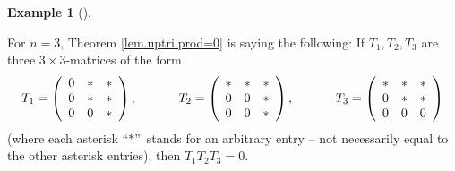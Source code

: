 \documentclass[numbers=enddot,12pt,final,onecolumn,notitlepage]{scrartcl}%
\numberwithin{exer}{subsection}
\theoremstyle{definition}
\newtheorem{exam}[theo]{Example}
\newenvironment{example}[1][]
{\begin{exam}[#1]\begin{leftbar}}
{\end{leftbar}\end{exam}}
\begin{document}
\begin{example}
For $n=3$, Theorem \ref{lem.uptri.prod=0} is saying the following: If
$T_{1},T_{2},T_{3}$ are three $3\times3$-matrices of the form%
\[
T_{1}=\left(
\begin{array}
[c]{ccc}%
0 & \ast & \ast\\
0 & \ast & \ast\\
0 & 0 & \ast
\end{array}
\right)  ,\ \ \ \ \ \ \ \ \ \ T_{2}=\left(
\begin{array}
[c]{ccc}%
\ast & \ast & \ast\\
0 & 0 & \ast\\
0 & 0 & \ast
\end{array}
\right)  ,\ \ \ \ \ \ \ \ \ \ T_{3}=\left(
\begin{array}
[c]{ccc}%
\ast & \ast & \ast\\
0 & \ast & \ast\\
0 & 0 & 0
\end{array}
\right)
\]
(where each asterisk \textquotedblleft$\ast$\textquotedblright\ stands for an
arbitrary entry -- not necessarily equal to the other asterisk entries), then
$T_{1}T_{2}T_{3}=0$.
\end{example}
\end{document}
